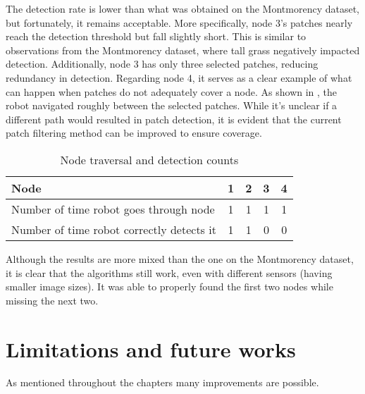 The detection rate is lower than what was obtained on the Montmorency dataset, but fortunately, it remains acceptable.
More specifically, node 3’s patches nearly reach the detection threshold but fall slightly short.
This is similar to observations from the Montmorency dataset, where tall grass negatively impacted detection.
Additionally, node 3 has only three selected patches, reducing redundancy in detection.
Regarding node 4, it serves as a clear example of what can happen when patches do not adequately cover a node.
As shown in , the robot navigated roughly between the selected patches.
While it’s unclear if a different path would resulted in patch detection, it is evident that the current patch filtering
method can be improved to ensure coverage.

\begin{table}[ht!]
    \centering
    \begin{tabular}{|l|c|c|c|c|}
        \hline
        Node                                      & 1 & 2 & 3 & 4 \\ \hline
        Number of time robot goes through node    & 1 & 1 & 1 & 1 \\ \hline
        Number of time robot correctly detects it & 1 & 1 & 0 & 0 \\ \hline
    \end{tabular}
    \caption{Node traversal and detection counts}
    \label{tab:hub_drone:node_detection}
\end{table}

Although the results are more mixed than the one on the Montmorency dataset, it is clear that the algorithms still work, even
with different sensors (having smaller image sizes).
It was able to properly found the first two nodes while missing the next two.


\section{Limitations and future works}\label{sec:limitations-and-future-works}



As mentioned throughout the chapters many improvements are possible.


